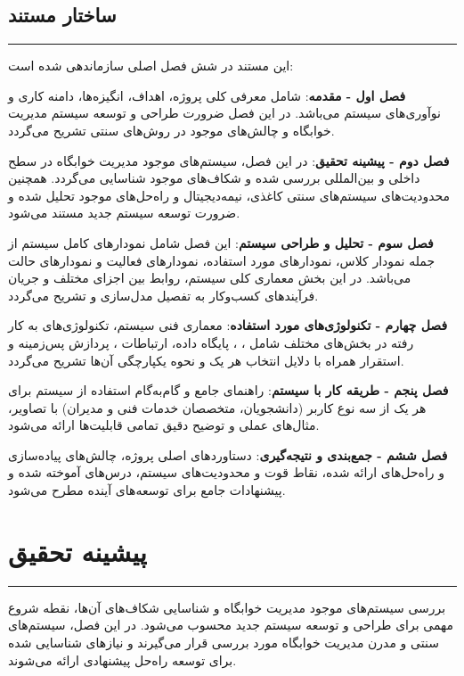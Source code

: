 \documentclass[12pt,a4paper]{report}
\begin{document}
	
	\section{ساختار مستند}
	\noindent\rule{\textwidth}{0.4pt}
	
	این مستند در شش فصل اصلی سازماندهی شده است:
	
	\textbf{فصل اول - مقدمه}: شامل معرفی کلی پروژه، اهداف، انگیزه‌ها، دامنه کاری و نوآوری‌های سیستم می‌باشد. در این فصل ضرورت طراحی و توسعه سیستم مدیریت خوابگاه و چالش‌های موجود در روش‌های سنتی تشریح می‌گردد.
	
	\textbf{فصل دوم - پیشینه تحقیق}: در این فصل، سیستم‌های موجود مدیریت خوابگاه در سطح داخلی و بین‌المللی بررسی شده و شکاف‌های موجود شناسایی می‌گردد. همچنین محدودیت‌های سیستم‌های سنتی کاغذی، نیمه‌دیجیتال و راه‌حل‌های موجود تحلیل شده و ضرورت توسعه سیستم جدید مستند می‌شود.
	
	\textbf{فصل سوم - تحلیل و طراحی سیستم}: این فصل شامل نمودارهای  کامل سیستم از جمله نمودار کلاس، نمودارهای مورد استفاده، نمودارهای فعالیت و نمودارهای حالت می‌باشد. در این بخش معماری کلی سیستم، روابط بین اجزای مختلف و جریان فرآیندهای کسب‌وکار به تفصیل مدل‌سازی و تشریح می‌گردد.
	
	\textbf{فصل چهارم - تکنولوژی‌های مورد استفاده}: معماری فنی سیستم، تکنولوژی‌های به کار رفته در بخش‌های مختلف شامل ، ، پایگاه داده، ارتباطات ، پردازش پس‌زمینه و استقرار همراه با دلایل انتخاب هر یک و نحوه یکپارچگی آن‌ها تشریح می‌گردد.
	
	\textbf{فصل پنجم - طریقه کار با سیستم}: راهنمای جامع و گام‌به‌گام استفاده از سیستم برای هر یک از سه نوع کاربر (دانشجویان، متخصصان خدمات فنی و مدیران) با تصاویر، مثال‌های عملی و توضیح دقیق تمامی قابلیت‌ها ارائه می‌شود.
	
	\textbf{فصل ششم - جمع‌بندی و نتیجه‌گیری}: دستاوردهای اصلی پروژه، چالش‌های پیاده‌سازی و راه‌حل‌های ارائه شده، نقاط قوت و محدودیت‌های سیستم، درس‌های آموخته شده و پیشنهادات جامع برای توسعه‌های آینده مطرح می‌شود.
	
	\chapter{پیشینه تحقیق}
	\vspace{-2.5\baselineskip}
	\noindent\rule{\textwidth}{0.4pt}
	
	\hspace{-0.1cm}
	بررسی سیستم‌های موجود مدیریت خوابگاه و شناسایی شکاف‌های آن‌ها، نقطه شروع مهمی برای طراحی و توسعه سیستم جدید محسوب می‌شود. در این فصل، سیستم‌های سنتی و مدرن مدیریت خوابگاه مورد بررسی قرار می‌گیرند و نیازهای شناسایی شده برای توسعه راه‌حل پیشنهادی ارائه می‌شوند.
	
\end{document}
